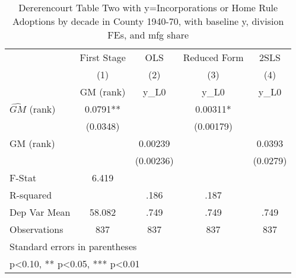 \begin{table}[htbp]\centering
\def\sym#1{\ifmmode^{#1}\else\(^{#1}\)\fi}
\caption{Dererencourt Table Two with y=Incorporations or Home Rule Adoptions by decade in County 1940-70, with baseline y, division FEs, and mfg share}
\begin{tabular}{l*{4}{c}}
\toprule
                    & First Stage   &         OLS   &Reduced Form   &        2SLS   \\
                    &\multicolumn{1}{c}{(1)}&\multicolumn{1}{c}{(2)}&\multicolumn{1}{c}{(3)}&\multicolumn{1}{c}{(4)}\\
                    &\multicolumn{1}{c}{GM  (rank)}&\multicolumn{1}{c}{y\_L0}&\multicolumn{1}{c}{y\_L0}&\multicolumn{1}{c}{y\_L0}\\
\midrule
$\hat{GM}$ (rank)   &      0.0791** &               &     0.00311*  &               \\
                    &    (0.0348)   &               &   (0.00179)   &               \\
\addlinespace
GM  (rank)          &               &     0.00239   &               &      0.0393   \\
                    &               &   (0.00236)   &               &    (0.0279)   \\
\midrule
F-Stat              &       6.419   &               &               &               \\
R-squared           &               &        .186   &        .187   &               \\
Dep Var Mean        &      58.082   &        .749   &        .749   &        .749   \\
Observations        &         837   &         837   &         837   &         837   \\
\bottomrule
\multicolumn{5}{l}{\footnotesize Standard errors in parentheses}\\
\multicolumn{5}{l}{\footnotesize * p<0.10, ** p<0.05, *** p<0.01}\\
\end{tabular}
\end{table}

